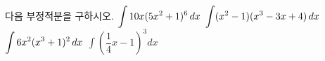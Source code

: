 다음 부정적분을 구하시오.
 $\displaystyle\int 10x(5x^2+1)^6\mkern3mu dx$
 $\displaystyle\int(x^2-1)(x^3-3x+4)\mkern3mu dx$
 $\displaystyle\int 6x^2(x^3+1)^2\mkern3mu dx$
 $\displaystyle\int\left(\dfrac{1}{4}x-1\right)^3dx$
